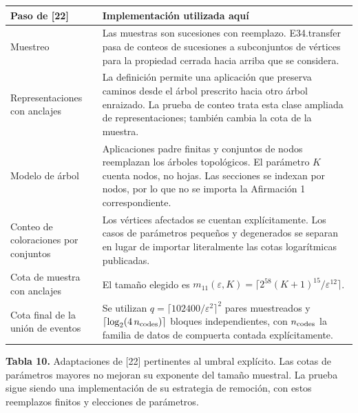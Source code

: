 \documentclass[spanish,11pt,a4paper]{article}
\newcounter{none}
\begin{document}
{\def\LTcaptype{none} %
\begin{longtable}[c]{@{}
  >{\raggedright\arraybackslash}p{}
  >{\raggedright\arraybackslash}p{}@{}}
\toprule\noalign{}
\begin{minipage}[b]{\linewidth}\raggedright
Paso de {[}22{]}
\end{minipage} & \begin{minipage}[b]{\linewidth}\raggedright
Implementación utilizada aquí
\end{minipage} \\
\midrule\noalign{}
\endhead
\bottomrule\noalign{}
\endlastfoot
Muestreo & Las muestras son sucesiones con reemplazo. {\ttfamily\small E34.\discretionary{\hbox{\ensuremath{\hookrightarrow}}}{}{}transfer} pasa de conteos de sucesiones a subconjuntos de vértices para la propiedad cerrada hacia arriba que se considera. \\
Representaciones con anclajes & La definición permite una aplicación que preserva caminos desde el árbol prescrito hacia otro árbol enraizado. La prueba de conteo trata esta clase ampliada de representaciones; también cambia la cota de la muestra. \\
Modelo de árbol & Aplicaciones padre finitas y conjuntos de nodos reemplazan los árboles topológicos. El parámetro \(K\) cuenta nodos, no hojas. Las secciones se indexan por nodos, por lo que no se importa la Afirmación 1 correspondiente. \\
Conteo de coloraciones por conjuntos & Los vértices afectados se cuentan explícitamente. Los casos de parámetros pequeños y degenerados se separan en lugar de importar literalmente las cotas logarítmicas publicadas. \\
Cota de muestra con anclajes & El tamaño elegido es \(m_{11}(\varepsilon,K)=\lceil2^{58}(K+1)^{15}/\varepsilon^{12}\rceil\). \\
Cota final de la unión de eventos & Se utilizan \(q=\lceil102400/\varepsilon^2\rceil^2\) pares muestreados y \(\lceil\log_2(4\,n_{\rm codes})\rceil\) bloques independientes, con \(n_{\rm codes}\) la familia de datos de compuerta contada explícitamente. \\
\end{longtable}
}

\textbf{Tabla 10.} Adaptaciones de {[}22{]} pertinentes al umbral explícito. Las cotas de parámetros mayores no mejoran su exponente del tamaño muestral. La prueba sigue siendo una implementación de su estrategia de remoción, con estos reemplazos finitos y elecciones de parámetros.
\end{document}
